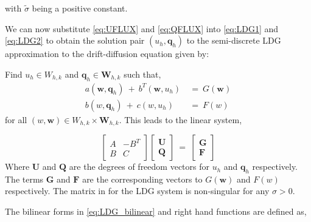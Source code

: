 \documentclass[12pt,letterpaper]{article}
\begin{document}
\noindent
with $\tilde{\sigma}$ being a positive constant.

\vspace{2mm}

We can now substitute \eqref{eq:UFLUX} and \eqref{eq:QFLUX} into \eqref{eq:LDG1} and \eqref{eq:LDG2} to obtain the solution pair $(u_{h}, \textbf{q}_{h})$ to the semi-discrete LDG approximation to the drift-diffusion equation given by:

\vspace{2mm}

 
Find $u_{h} \in W_{h,k}$ and $\textbf{q}_{h} \in  \textbf{W}_{h,k}$ such that,
\begin{align}
a(\textbf{w}, \textbf{q}_{h})  \ +  \ b^{T}(\textbf{w}, u_{h}) \ &= \ G(\textbf{w}) \nonumber \\
b(w, \textbf{q}_{h}) \ + \   c(w, u_{h})  \ &= \ F(w)
\label{eq:LDG_bilinear}
\end{align}
\noindent
for all $(w, \textbf{w}) \in W_{h,k} \times \textbf{W}_{h,k}$.  This leads to the linear system,

\begin{equation}
\left[ 
\begin{matrix}
A  & -B^{T}  \\
B & C 
\end{matrix}
\right]
\left[
\begin{matrix}
\textbf{U}\\
\textbf{Q}
\end{matrix}
\right]
\ = \
\left[
\begin{matrix}
\textbf{G}\\
\textbf{F}
\end{matrix}
\right]
\end{equation}
Where $\textbf{U}$ and $\textbf{Q}$ are the degrees of freedom vectors for $u_{h}$ and $\textbf{q}_{h}$ respectively. The terms $\textbf{G}$ and $\textbf{F}$ are the corresponding vectors to $G(\textbf{w})$ and $F(w)$ respectively. The matrix in for the LDG system is non-singular for any $\sigma > 0$.

\vspace{2mm}

The bilinear forms  in \eqref{eq:LDG_bilinear} and right hand functions are defined as,
\end{document}
